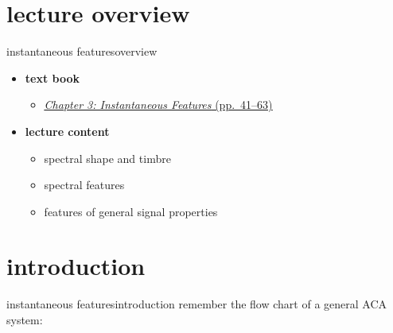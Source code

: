     \section[overview]{lecture overview}
        \begin{frame}{instantaneous features}{overview}
            \begin{itemize}
                \item   \textbf{text book}  
                    \begin{itemize}
                        \item   \href{http://ieeexplore.ieee.org/xpl/articleDetails.jsp?tp=&arnumber=6331120&}{\underline{\textit{Chapter 3: Instantaneous Features} (pp.~41--63)}}
                    \end{itemize}
                \bigskip
                \item<2->   \textbf{lecture content}
                    \begin{itemize}
                        \item<2->   spectral shape and timbre
                        \item<3->   spectral features
                        \item<4->   features of general signal properties
                    \end{itemize}
            \end{itemize}
        \end{frame}

    \section[intro]{introduction}
        \begin{frame}{instantaneous features}{introduction}
            remember the flow chart of a general ACA system:
            \vspace{-2mm}
            \begin{figure}
                
            \end{figure}
        \end{frame}
        

